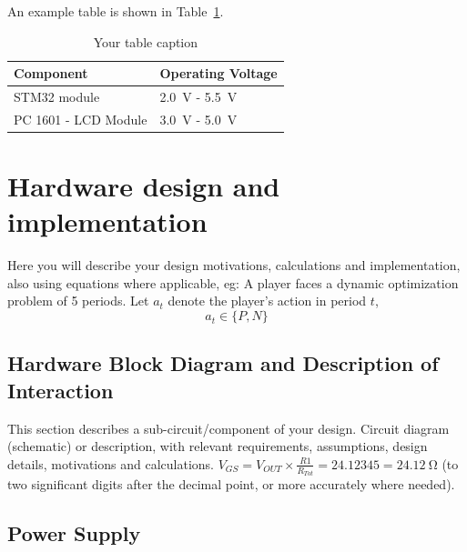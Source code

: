 \documentclass[11pt,a4paper]{article}
\begin{document}
	An example table is shown in Table~\ref{tab:components}.
	\begin{table}[ht]
		\begin{center}
			\caption{Your table caption}
			\begin{tabular}{| l | l |}
				\hline
				Component & Operating Voltage\\
				\hline
				STM32 module & \SI{2.0}{\volt} - \SI{5.5}{\volt}\\
				PC 1601 - LCD Module & \SI{3.0}{\volt} - \SI{5.0}{\volt}\\
				\hline
			\end{tabular}
			\label{tab:components}
		\end{center}
	\end{table}
	
	\section{Hardware design and implementation}
	Here you will describe your design motivations, calculations and implementation, also using equations where applicable, eg: A player faces a dynamic optimization problem of 5 periods. Let $a_t$ denote the player's action in period $t$,
	\begin{equation}
	a_t \in \{P,N\}
	\end{equation}
	
	\subsection{Hardware Block Diagram and Description of Interaction}
	This section describes a sub-circuit/component of your design. Circuit diagram (schematic) or description, with relevant requirements, assumptions, design details, motivations and calculations. $V_{GS} = V_{OUT} \times \frac{R1}{R_{Tot}} = 24.12345 = \SI{24.12}{\ohm}$ (to two significant digits after the decimal point, or more accurately where needed).
	
	\subsection{Power Supply}
	
\end{document}
